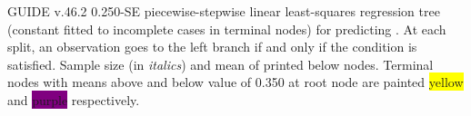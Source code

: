 \documentclass[12pt]{article}
\begin{document}
 \begin{center}
 \end{center}
GUIDE v.46.2 0.250-SE
piecewise-stepwise linear least-squares regression tree
 (constant fitted to incomplete cases in terminal nodes)
for predicting \texttt{}.
At each split, an observation goes to the left branch 
 if and only if the condition is satisfied.
Sample size (in \emph{italics}) and mean of \texttt{} printed below nodes.
 Terminal nodes with means above and below value of  0.350  at root node are painted \colorbox{yellow}{yellow} and \colorbox{purple}{purple} respectively.
 
\end{document}
